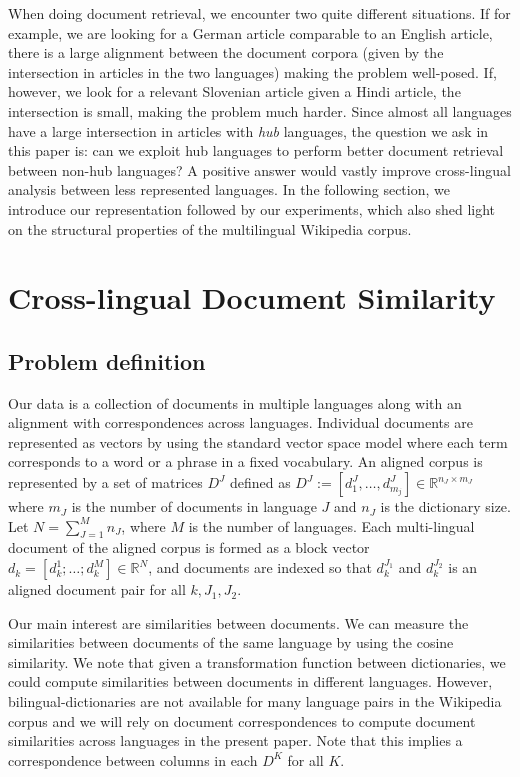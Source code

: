 \documentclass[twoside,11pt]{article}
\newcommand{\RR}{\mathbb{R}}
\begin{document}
When doing document retrieval, we encounter two quite different situations. If for example, we are looking for a German article comparable to an English article, there is a large alignment between the document corpora (given by the intersection in articles in the two languages) making the problem well-posed. If, however, we look for a relevant Slovenian article given a Hindi article, the intersection is small, making the problem much harder. Since almost all languages have a large intersection in articles with \emph{hub} languages, the question we ask in this paper is: can we exploit hub languages to perform better document retrieval between non-hub languages? A positive answer would vastly improve cross-lingual analysis between less represented languages. In the following section, we introduce our representation followed by our experiments, which also shed light on the structural properties of the multilingual Wikipedia corpus.


\section{Cross-lingual Document Similarity}


\subsection{Problem definition}




Our data is a collection of documents in multiple languages along with an alignment with correspondences across languages. Individual documents are represented as vectors by using the standard vector space model where each term corresponds to a word or a phrase in a fixed vocabulary. An aligned corpus is represented by a set of matrices $D^J$ defined as $D^J := [d_1^J , \ldots , d_{m_j}^J ] \in \RR^{n_J \times m_J}$ where $m_J$ is the number of documents in language $J$ and $n_J$ is the dictionary size. Let $N = \sum_{J=1}^M n_J$, where $M$ is the number of languages. Each multi-lingual document of the aligned corpus is formed as a block vector $d_k = [ d_k^1; \dots; d_k^M] \in \RR^{N}$, and documents are indexed so that $d_k^{J_1}$ and $d_k^{J_2}$ is an aligned document pair for all $k, J_1, J_2$.

Our main interest are similarities between documents. We can measure the similarities between documents of the same language by using the cosine similarity. We note that given a transformation function between dictionaries, we could compute similarities between documents in different languages. However, bilingual-dictionaries are not available for many language pairs in the Wikipedia corpus and we will rely on document correspondences to compute document similarities across languages in the present paper. Note that this implies a correspondence between columns in each $D^K$ for all $K$.
\end{document}
